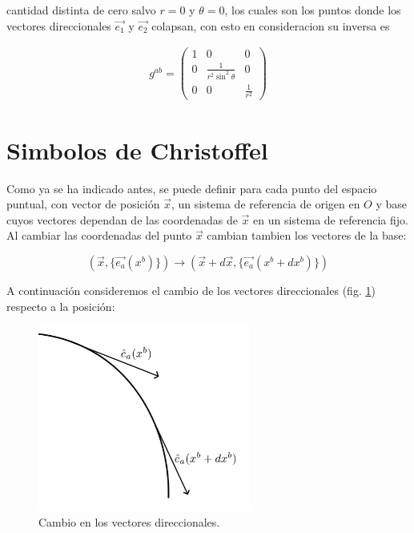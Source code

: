 \documentclass[12pt]{report}
\begin{document}
cantidad distinta de cero salvo $r=0$ y $\theta=0$, los cuales son los puntos donde los vectores direccionales $\vec{e_1}$ y $\vec{e_2}$ colapsan, con esto en consideracion su inversa es

\begin{eqnarray} \label{2.75}
g^{ab}=
\left(
\begin{array}{ccc}
1 & 0 & 0 \\
0 & \displaystyle\frac{1}{r^2 \sin^2 \theta} & 0 \\
0 & 0 & \displaystyle \frac{1}{r^2}
\end{array}
\right)
\end{eqnarray}


















\section{Simbolos de Christoffel}

Como ya se ha indicado antes, se puede definir para cada punto del espacio puntual, con vector de posición $\vec{x}$, un sistema de referencia de origen en $O$ y base cuyos vectores dependan de las coordenadas de $\vec{x}$ en un sistema de referencia fijo. \\
Al cambiar las coordenadas del punto $\vec{x}$ cambian tambien los vectores de la base:

\begin{equation} \nonumber
(\vec{x},\{\vec{e_a}(x^b) \}) \longrightarrow ( \vec{x}+d\vec{x},\{\vec{e_a}(x^b + dx^b)  \})
\end{equation}


A continuación consideremos el cambio de los vectores  direccionales (fig. \ref{fig2112}) respecto a la posición:

\begin{figure}
	\centering
	\includegraphics[width=7cm]{figura81.png}
	\caption{ Cambio en los vectores direccionales.}
	\label{fig2112}
\end{figure}
\end{document}
